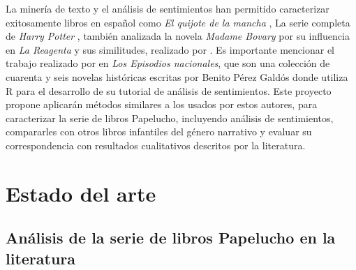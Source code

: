 La minería de texto y el análisis de sentimientos han permitido caracterizar exitosamente libros en español como \textit{El quijote de la mancha} \citep{Quixote-R}, La serie completa de \textit{Harry Potter} \citep{HarryPotter-R}, también analizada la novela \textit{Madame Bovary} por su influencia en \textit{La Reagenta} y sus similitudes, realizado por \citet{zahonero2020nueva}. Es importante mencionar el trabajo realizado por \citet{apastyle} en \textit{Los Episodios nacionales}, que son una colección de cuarenta y seis novelas históricas escritas por Benito Pérez Galdós donde utiliza R para el desarrollo de su tutorial de análisis de sentimientos. Este proyecto propone aplicarán métodos similares a los usados por estos autores, para caracterizar la serie de libros Papelucho, incluyendo análisis de sentimientos, compararles con otros libros infantiles del género narrativo y evaluar su correspondencia con resultados cualitativos descritos por la literatura.

    
\section{Estado del arte} \label{sec:estado_arte}

    
\subsection{Análisis de la serie de libros Papelucho en la literatura}

